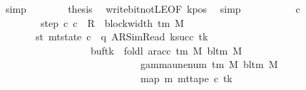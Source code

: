 \begin{isabellebody}
\ simp\isanewline
\ \ \ \ \ \ \isamarkupfalse%
\ {\isacharquery}{\kern0pt}thesis\ \isamarkupfalse%
\ write{\isacharunderscore}{\kern0pt}bit{\isacharunderscore}{\kern0pt}not{\isacharunderscore}{\kern0pt}LE{}{\isacharbrackleft}{\kern0pt}OF\ kpos{\isacharbrackright}{\kern0pt}\ \isamarkupfalse%
\ simp\isanewline
\ \ \ \ \isamarkupfalse%
\isanewline
\ \ \ \ \isamarkupfalse%
\ c{\isacharprime}{\kern0pt}{\isacharprime}{\kern0pt}\ \isanewline
\ \ \ \ \ \ \ \ step{\isacharcolon}{\kern0pt}\ {\isachardoublequoteopen}{\isacharparenleft}{\kern0pt}c{\isacharprime}{\kern0pt}{\isacharcomma}{\kern0pt}\ c{\isacharprime}{\kern0pt}{\isacharprime}{\kern0pt}{\isacharparenright}{\kern0pt}\ {\isasymin}\ R{\isacharprime}{\kern0pt}\ {\isacharcircum}{\kern0pt}{\isacharcircum}{\kern0pt}\ {\isacharparenleft}{\kern0pt}block{\isacharunderscore}{\kern0pt}width\ {\isacharparenleft}{\kern0pt}{\isasymGamma}{\isacharunderscore}{\kern0pt}tm\ M{\isacharparenright}{\kern0pt}\ {\isacharplus}{\kern0pt}\ {}{\isacharparenright}{\kern0pt}{\isachardoublequoteclose}\isanewline
\ \ \ \ \ \ \ st{\isacharcolon}{\kern0pt}\ {\isachardoublequoteopen}mt{\isacharunderscore}{\kern0pt}state\ c{\isacharprime}{\kern0pt}{\isacharprime}{\kern0pt}\ {\isacharequal}{\kern0pt}\ {\isacharparenleft}{\kern0pt}q{\isacharcomma}{\kern0pt}\ AR{\isacharunderscore}{\kern0pt}SimRead{\isacharcomma}{\kern0pt}\ k{\isacharunderscore}{\kern0pt}succ\ tk{\isacharcomma}{\kern0pt}\ {}{\isacharcomma}{\kern0pt}\isanewline
\ \ \ \ \ \ \ \ \ \ \ \ \ \ \ \ \ \ buf{\isacharparenleft}{\kern0pt}tk\ {\isacharcolon}{\kern0pt}{\isacharequal}{\kern0pt}\ foldl\ {\isacharparenleft}{\kern0pt}ar{\isacharunderscore}{\kern0pt}acc\ {\isacharparenleft}{\kern0pt}{\isasymGamma}{\isacharunderscore}{\kern0pt}tm\ M{\isacharparenright}{\kern0pt}\ {\isacharparenleft}{\kern0pt}bl{\isacharunderscore}{\kern0pt}tm\ M{\isacharparenright}{\kern0pt}{\isacharparenright}{\kern0pt}\isanewline
\ \ \ \ \ \ \ \ \ \ \ \ \ \ \ \ \ \ \ \ \ \ \ \ \ \ \ \ {\isacharparenleft}{\kern0pt}gamma{\isacharunderscore}{\kern0pt}unenum\ {\isacharparenleft}{\kern0pt}{\isasymGamma}{\isacharunderscore}{\kern0pt}tm\ M{\isacharparenright}{\kern0pt}\ {\isacharparenleft}{\kern0pt}bl{\isacharunderscore}{\kern0pt}tm\ M{\isacharparenright}{\kern0pt}\ {}{\isacharparenright}{\kern0pt}\isanewline
\ \ \ \ \ \ \ \ \ \ \ \ \ \ \ \ \ \ \ \ \ \ \ \ \ \ \ \ {\isacharparenleft}{\kern0pt}map\ {\isacharparenleft}{\kern0pt}{\isasymlambda}m{\isachardot}{\kern0pt}\ mt{\isacharunderscore}{\kern0pt}tape\ c{\isacharprime}{\kern0pt}\ tk\isanewline

\end{isabellebody}
